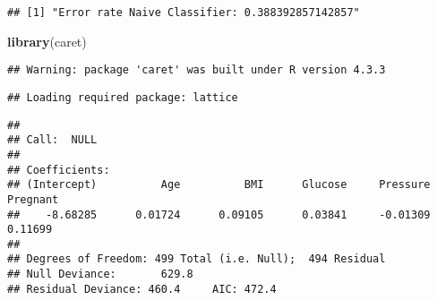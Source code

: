 \documentclass[
]{article}
\newenvironment{Shaded}{\begin{snugshade}}{\end{snugshade}}
\newcommand{\AttributeTok}[1]{\textcolor[rgb]{0.13,0.29,0.53}{#1}}
\newcommand{\CommentTok}[1]{\textcolor[rgb]{0.56,0.35,0.01}{\textit{#1}}}
\newcommand{\ConstantTok}[1]{\textcolor[rgb]{0.56,0.35,0.01}{#1}}
\newcommand{\DecValTok}[1]{\textcolor[rgb]{0.00,0.00,0.81}{#1}}
\newcommand{\FunctionTok}[1]{\textcolor[rgb]{0.13,0.29,0.53}{\textbf{#1}}}
\newcommand{\NormalTok}[1]{#1}
\newcommand{\OtherTok}[1]{\textcolor[rgb]{0.56,0.35,0.01}{#1}}
\newcommand{\SpecialCharTok}[1]{\textcolor[rgb]{0.81,0.36,0.00}{\textbf{#1}}}
\newcommand{\StringTok}[1]{\textcolor[rgb]{0.31,0.60,0.02}{#1}}
\begin{document}
\begin{verbatim}
## [1] "Error rate Naive Classifier: 0.388392857142857"
\end{verbatim}

\begin{Shaded}
\begin{Highlighting}[]
\FunctionTok{library}\NormalTok{(caret)}
\end{Highlighting}
\end{Shaded}

\begin{verbatim}
## Warning: package 'caret' was built under R version 4.3.3
\end{verbatim}

\begin{verbatim}
## Loading required package: lattice
\end{verbatim}

\begin{Shaded}
\end{Shaded}

\begin{verbatim}
## 
## Call:  NULL
## 
## Coefficients:
## (Intercept)          Age          BMI      Glucose     Pressure     Pregnant  
##    -8.68285      0.01724      0.09105      0.03841     -0.01309      0.11699  
## 
## Degrees of Freedom: 499 Total (i.e. Null);  494 Residual
## Null Deviance:       629.8 
## Residual Deviance: 460.4     AIC: 472.4
\end{verbatim}
\end{document}
